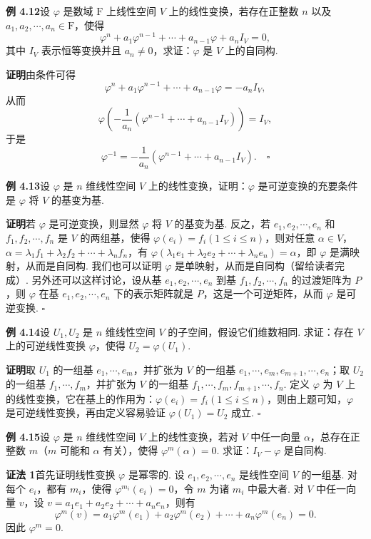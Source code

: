 \documentclass[UTF8,12pt,a4paper,fontset=fandol]{ctexart}
\begin{document}
\noindent\textbf{例 4.12}\quad 设 $\varphi$ 是数域 $\mathrm{F}$ 上线性空间 $V$ 上的线性变换，若存在正整数 $n$ 以及 $a_1,a_2,\cdots,a_n\in\mathrm{F}$，使得
\[
\varphi^n+a_1\varphi^{n-1}+\cdots+a_{n-1}\varphi+a_nI_V=0,
\]
其中 $I_V$ 表示恒等变换并且 $a_n\ne0$，求证：$\varphi$ 是 $V$ 上的自同构.

\noindent\textbf{证明}\quad 由条件可得
\[
\varphi^n+a_1\varphi^{n-1}+\cdots+a_{n-1}\varphi=-a_nI_V,
\]
从而
\[
\varphi\left(-\frac1{a_n}(\varphi^{n-1}+\cdots+a_{n-1}I_V)\right)=I_V,
\]
于是
\[
\varphi^{-1}=-\frac1{a_n}(\varphi^{n-1}+\cdots+a_{n-1}I_V). \quad \square
\]

\noindent\textbf{例 4.13}\quad 设 $\varphi$ 是 $n$ 维线性空间 $V$ 上的线性变换，证明：$\varphi$ 是可逆变换的充要条件是 $\varphi$ 将 $V$ 的基变为基.

\noindent\textbf{证明}\quad 若 $\varphi$ 是可逆变换，则显然 $\varphi$ 将 $V$ 的基变为基. 反之，若 $e_1,e_2,\cdots,e_n$ 和 $f_1,f_2,\cdots,f_n$ 是 $V$ 的两组基，使得 $\varphi(e_i)=f_i(1\le i\le n)$，则对任意 $\alpha\in V$，$\alpha=\lambda_1f_1+\lambda_2f_2+\cdots+\lambda_nf_n$，有 $\varphi(\lambda_1e_1+\lambda_2e_2+\cdots+\lambda_ne_n)=\alpha$，即 $\varphi$ 是满映射，从而是自同构. 我们也可以证明 $\varphi$ 是单映射，从而是自同构（留给读者完成）. 另外还可以这样讨论，设从基 $e_1,e_2,\cdots,e_n$ 到基 $f_1,f_2,\cdots,f_n$ 的过渡矩阵为 $P$，则 $\varphi$ 在基 $e_1,e_2,\cdots,e_n$ 下的表示矩阵就是 $P$，这是一个可逆矩阵，从而 $\varphi$ 是可逆变换. $\square$

\noindent\textbf{例 4.14}\quad 设 $U_1,U_2$ 是 $n$ 维线性空间 $V$ 的子空间，假设它们维数相同. 求证：存在 $V$ 上的可逆线性变换 $\varphi$，使得 $U_2=\varphi(U_1)$.

\noindent\textbf{证明}\quad 取 $U_1$ 的一组基 $e_1,\cdots,e_m$，并扩张为 $V$ 的一组基 $e_1,\cdots,e_m,e_{m+1},\cdots,e_n$；取 $U_2$ 的一组基 $f_1,\cdots,f_m$，并扩张为 $V$ 的一组基 $f_1,\cdots,f_m,f_{m+1},\cdots,f_n$. 定义 $\varphi$ 为 $V$ 上的线性变换，它在基上的作用为：$\varphi(e_i)=f_i(1\le i\le n)$，则由上题可知，$\varphi$ 是可逆线性变换，再由定义容易验证 $\varphi(U_1)=U_2$ 成立. $\square$

\noindent\textbf{例 4.15}\quad 设 $\varphi$ 是 $n$ 维线性空间 $V$ 上的线性变换，若对 $V$ 中任一向量 $\alpha$，总存在正整数 $m$（$m$ 可能和 $\alpha$ 有关），使得 $\varphi^m(\alpha)=0$. 求证：$I_V-\varphi$ 是自同构.

\noindent\textbf{证法 1}\quad 首先证明线性变换 $\varphi$ 是幂零的. 设 $e_1,e_2,\cdots,e_n$ 是线性空间 $V$ 的一组基. 对每个 $e_i$，都有 $m_i$，使得 $\varphi^{m_i}(e_i)=0$，令 $m$ 为诸 $m_i$ 中最大者. 对 $V$ 中任一向量 $v$，设 $v=a_1e_1+a_2e_2+\cdots+a_ne_n$，则有
\[
\varphi^m(v)=a_1\varphi^m(e_1)+a_2\varphi^m(e_2)+\cdots+a_n\varphi^m(e_n)=0.
\]
因此 $\varphi^m=0$.
\end{document}
